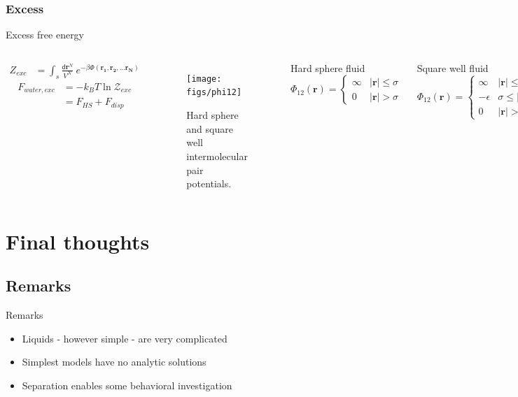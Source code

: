 \documentclass{beamer}
\newcommand*{\diff}{\mathsf{d}}
\renewcommand{\vec}[1]{\mathbf{#1}}
\begin{document}
\subsubsection*{Excess}
\begin{frame}{Excess free energy}	
	\begin{columns}[t]
	\setlength\abovedisplayskip{-2pt} 
	\begin{align*}
		Z_{exc} &= \int_s \frac{\diff\mathbf{r}^N}{V^N} ~e^{-\beta \Phi(\mathbf{r_1}, \mathbf{r_2}, \dots \mathbf{r_N})}
	\end{align*}
	\begin{align*}
		F_{water, exc} &= -k_B T \ln \mathcal{Z}_{exc}\\
		&= F_{HS} + F_{disp}
	\end{align*}
	\begin{figure}
	\texttt{[image: figs/phi12]}
	\caption{Hard sphere and square well intermolecular pair potentials.}
	\end{figure}
	\begin{block}{Hard sphere fluid}
	\setlength\abovedisplayskip{-2pt} 
		\begin{equation*} 
			\Phi_{12}(\mathbf r) = \begin{cases}\infty & |\vec{r}|\leq \sigma\\  0 & |\vec{r}| > \sigma \end{cases}
			\label{phi12_hs}
		\end{equation*}
	\end{block}
	\begin{block}{Square well fluid}
	\setlength\abovedisplayskip{-2pt} 
		\begin{equation*} 
			\Phi_{12}(\mathbf r) = \begin{cases}\infty & |\vec{r}|\leq \sigma\\ -\epsilon & \sigma \leq |\vec{r}| \leq \sigma\lambda\\ 0 & |\vec{r}| > \sigma\lambda \end{cases}
			\label{phi12_sw}
		\end{equation*}
	\end{block}
	\end{columns}
\end{frame}

\section*{Final thoughts}
\subsection*{Remarks}
\begin{frame}{Remarks}
	\begin{itemize}
		\item Liquids - however simple - are very complicated
		\item Simplest models have no analytic solutions
		\item Separation enables some behavioral investigation
	\end{itemize}
\end{frame}
\end{document}

